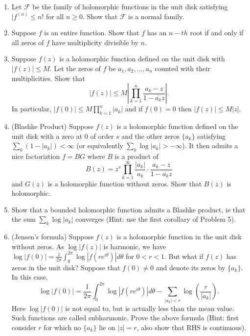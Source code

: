 \documentclass[letterpaper, 12pt]{article}
\begin{document}
\begin{enumerate}
    \item
        Let \(\mathcal{F}\) be the family of holomorphic functions in the unit disk satisfying \(|f^{(n)} \leq n! \) for all \(n \geq 0\). Show that \(\mathcal{F}\) is a normal family.

    \item
    Suppose \(f\) is an entire function. Show that \(f\) has an \(n-th\) root if and only if all zeros of \(f\) have multiplicity divisible by \(n\).
    
    \item
    Suppose \(f(z)\) is a holomorphic function defined on the unit disk with \(|f(z)| \leq M\). Let the zeros of \(f\) be \(a_1, a_2, \dots, a_n\) counted with their multiplicities. Show that 
    \[ |f(z)| \leq M \left| \prod_{k=1}^n \frac{a_k - z}{1 - \overline{a_k}z}\right|.\]
    In particular, \(|f(0)| \leq M \prod_{k=1}^n |a_k|\) and if \(f(0)=0\) then \(|f(z)| \leq M|z|\).

    \item
    (Blashke Product) Suppose \(f(z)\) is a holomorphic function defined on the unit disk with a zero at \(0\) of order \(s\) and the other zeros \(\{a_k\}\) satisfying \(\sum_k(1-|a_k|) < \infty\) (or equivalently \(\sum_k \log|a_k| > -\infty\)). It then admits a nice factoriztion \(f = BG\) where \(B\) is a product of 
    \[ B(z) = z^s \prod_{k=1}^\infty \frac{|a_k|}{a_k} \cdot \frac{a_k - z}{1- \overline{a_k}z}\]
    and \(G(z)\) is a holomorphic function without zeros. Show that \(B(z)\) is holomorphic.

    \item
    Show that a bounded holomorphic function admits a Blashke product, ie that the sum \(\sum_k \log|a_k|\) converges (Hint: use the first corollary of Problem 5).

    \item
    (Jensen's formula) Suppose \(f(z)\) is a holomorphic function in the unit disk without zeros. As \(\log |f(z)|\) is harmonic, we have \(\log|f(0)| = \frac{1}{2\pi} \int_0^{2\pi} \log|f(re^{i \theta})| d\theta \) for \(0 < r < 1\). But what if \(f(z)\) has zeros in the unit disk? Suppose that \(f(0) \neq 0\) and denote its zeros by \(\{a_k\}\). In this case,
        \[ \log|f(0)| = \frac{1}{2\pi} \int_0^{2\pi} \log|f(r e^{i\theta})| d \theta - \sum_{|a_k| < r} \log(\frac{r}{|a_k|}).\]
    Here \(\log|f(0)|\) is not equal to, but is actually less than the mean value. Such functions are called subharmonic. Prove the above formula (Hint: first consider \(r\) for which no \(\{a_k\}\) lie on \(|z| = r\), also show that RHS is continuous).


\end{enumerate}
\end{document}
